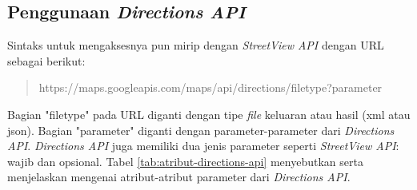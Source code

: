\subsection{Penggunaan {\it Directions API}}
Sintaks untuk mengaksesnya pun mirip dengan \textit{StreetView API} dengan URL sebagai berikut:
\begin{quote}
https://maps.googleapis.com/maps/api/directions/filetype?parameter
\end{quote}
Bagian "filetype" pada URL diganti dengan tipe \textit{file} keluaran atau hasil (xml atau json). Bagian "parameter" diganti dengan parameter-parameter dari {\it Directions API}.  {\it Directions API} juga memiliki dua jenis parameter seperti {\it StreetView API}: wajib dan opsional. Tabel \ref{tab:atribut-directions-api} menyebutkan serta menjelaskan mengenai atribut-atribut parameter dari \textit{Directions API}.

